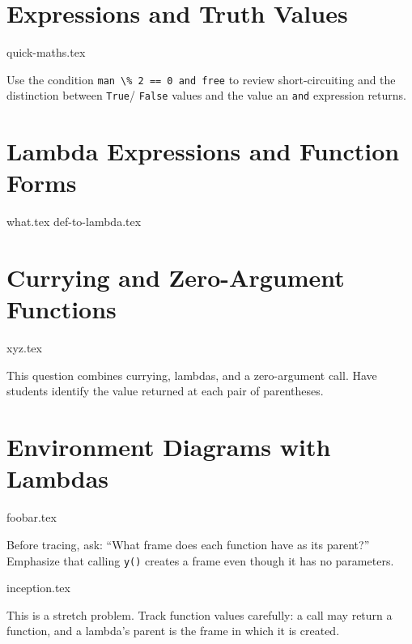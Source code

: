 \documentclass{exam}
\begin{document}
\section{Expressions and Truth Values}
\begin{questions}
    {quick-maths.tex}
    \begin{questionmeta}
        Use the condition \lstinline{man \% 2 == 0 and free} to review
        short-circuiting and the distinction between \lstinline{True}/
        \lstinline{False} values and the value an \lstinline{and} expression
        returns.
    \end{questionmeta}
\end{questions}

\section{Lambda Expressions and Function Forms}
\begin{questions}
    {what.tex}
    {def-to-lambda.tex}

\end{questions}

\section{Currying and Zero-Argument Functions}
\begin{questions}
    {xyz.tex}
    \begin{questionmeta}
        This question combines currying, lambdas, and a zero-argument call.
        Have students identify the value returned at each pair of parentheses.
    \end{questionmeta}
\end{questions}

\section{Environment Diagrams with Lambdas}
\begin{questions}
    {foobar.tex}
    \begin{questionmeta}
        Before tracing, ask: ``What frame does each function have as its
        parent?'' Emphasize that calling \lstinline{y()} creates a frame even
        though it has no parameters.
    \end{questionmeta}

    {inception.tex}
    \begin{questionmeta}
        This is a stretch problem. Track function values carefully: a call may
        return a function, and a lambda's parent is the frame in which it is
        created.
    \end{questionmeta}
\end{questions}
\end{document}
